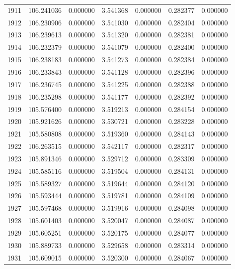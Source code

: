 \begin{tabular}{rrrrrrr}
1911 & 106.241036 &    0.000000 &  3.541368 &   0.000000 &   0.282377 &  0.000000 \\
1912 & 106.230906 &    0.000000 &  3.541030 &   0.000000 &   0.282404 &  0.000000 \\
1913 & 106.239613 &    0.000000 &  3.541320 &   0.000000 &   0.282381 &  0.000000 \\
1914 & 106.232379 &    0.000000 &  3.541079 &   0.000000 &   0.282400 &  0.000000 \\
1915 & 106.238183 &    0.000000 &  3.541273 &   0.000000 &   0.282384 &  0.000000 \\
1916 & 106.233843 &    0.000000 &  3.541128 &   0.000000 &   0.282396 &  0.000000 \\
1917 & 106.236745 &    0.000000 &  3.541225 &   0.000000 &   0.282388 &  0.000000 \\
1918 & 106.235298 &    0.000000 &  3.541177 &   0.000000 &   0.282392 &  0.000000 \\
1919 & 105.576400 &    0.000000 &  3.519213 &   0.000000 &   0.284154 &  0.000000 \\
1920 & 105.921626 &    0.000000 &  3.530721 &   0.000000 &   0.283228 &  0.000000 \\
1921 & 105.580808 &    0.000000 &  3.519360 &   0.000000 &   0.284143 &  0.000000 \\
1922 & 106.263515 &    0.000000 &  3.542117 &   0.000000 &   0.282317 &  0.000000 \\
1923 & 105.891346 &    0.000000 &  3.529712 &   0.000000 &   0.283309 &  0.000000 \\
1924 & 105.585116 &    0.000000 &  3.519504 &   0.000000 &   0.284131 &  0.000000 \\
1925 & 105.589327 &    0.000000 &  3.519644 &   0.000000 &   0.284120 &  0.000000 \\
1926 & 105.593444 &    0.000000 &  3.519781 &   0.000000 &   0.284109 &  0.000000 \\
1927 & 105.597468 &    0.000000 &  3.519916 &   0.000000 &   0.284098 &  0.000000 \\
1928 & 105.601403 &    0.000000 &  3.520047 &   0.000000 &   0.284087 &  0.000000 \\
1929 & 105.605251 &    0.000000 &  3.520175 &   0.000000 &   0.284077 &  0.000000 \\
1930 & 105.889733 &    0.000000 &  3.529658 &   0.000000 &   0.283314 &  0.000000 \\
1931 & 105.609015 &    0.000000 &  3.520300 &   0.000000 &   0.284067 &  0.000000 \\

\end{tabular}

